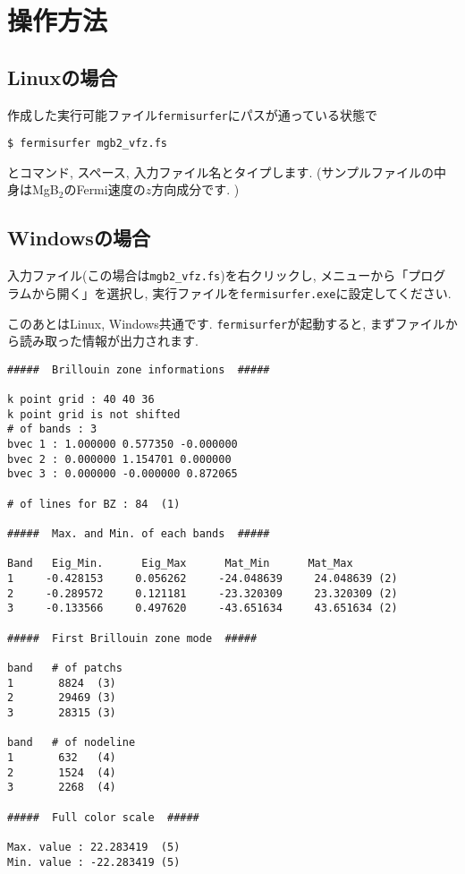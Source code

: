 \documentclass[12pt]{jarticle}
\begin{document}
\section{操作方法}

\subsection{Linuxの場合}
作成した実行可能ファイル\verb|fermisurfer|にパスが通っている状態で
\begin{verbatim}
$ fermisurfer mgb2_vfz.fs
\end{verbatim}
とコマンド, スペース, 入力ファイル名とタイプします. 
(サンプルファイルの中身はMgB$_2$のFermi速度の$z$方向成分です. )

\subsection{Windowsの場合}

入力ファイル(この場合は\verb|mgb2_vfz.fs|)を右クリックし,
メニューから「プログラムから開く」を選択し,
実行ファイルを\verb|fermisurfer.exe|に設定してください.

\vspace{0.5cm}
このあとはLinux, Windows共通です.
\verb|fermisurfer|が起動すると,
まずファイルから読み取った情報が出力されます. 

\begin{verbatim}
#####  Brillouin zone informations  ##### 

k point grid : 40 40 36 
k point grid is not shifted 
# of bands : 3 
bvec 1 : 1.000000 0.577350 -0.000000 
bvec 2 : 0.000000 1.154701 0.000000 
bvec 3 : 0.000000 -0.000000 0.872065 

# of lines for BZ : 84  (1)

#####  Max. and Min. of each bands  ##### 
     
Band   Eig_Min.      Eig_Max      Mat_Min      Mat_Max 
1     -0.428153     0.056262     -24.048639     24.048639 (2)
2     -0.289572     0.121181     -23.320309     23.320309 (2)
3     -0.133566     0.497620     -43.651634     43.651634 (2)

#####  First Brillouin zone mode  #####

band   # of patchs
1       8824  (3)
2       29469 (3)
3       28315 (3)

band   # of nodeline 
1       632   (4)
2       1524  (4)
3       2268  (4)

#####  Full color scale  ##### 

Max. value : 22.283419  (5)
Min. value : -22.283419 (5) 

\end{verbatim}
\end{document}

